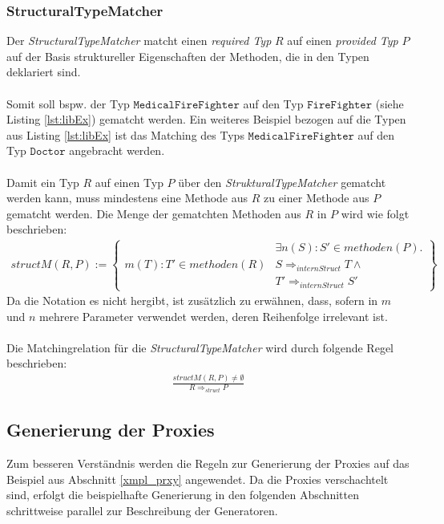 \documentclass[a4paper,12pt]{article}
\begin{document}
\subsubsection{StructuralTypeMatcher} 
Der \emph{StructuralTypeMatcher} matcht einen \emph{required Typ} $R$ auf einen \emph{provided Typ} $P$ auf der Basis struktureller Eigenschaften der Methoden, die in den Typen deklariert sind. 
\\\\
Somit soll bspw. der Typ $\texttt{MedicalFireFighter}$ auf den Typ $\texttt{FireFighter}$ (siehe Listing \ref{lst:libEx}) gematcht werden. Ein weiteres Beispiel bezogen auf die Typen aus Listing \ref{lst:libEx} ist das Matching des Typs $\texttt{MedicalFireFighter}$ auf den Typ $\texttt{Doctor}$ angebracht werden.
\\\\
Damit ein Typ $R$ auf einen Typ $P$ über den \emph{StrukturalTypeMatcher} gematcht werden kann, muss mindestens eine Methode aus $R$ zu einer Methode aus $P$ gematcht werden. Die Menge der gematchten Methoden aus $R$ in $P$ wird wie folgt beschrieben:
\begin{gather*}
structM(R,P) := \left\{ 
				\begin{array}{l|l}
						& \exists n(S):S' \in methoden(P) .\\													m(T):T' \in methoden(R) &  S\Rightarrow_{internStruct}T \wedge \\
										& T' \Rightarrow_{internStruct}S'
				\end{array}
              \right\}
\end{gather*}
Da die Notation es nicht hergibt, ist zusätzlich zu erwähnen, dass, sofern in $m$ und $n$ mehrere Parameter verwendet werden, deren Reihenfolge irrelevant ist.\\\\
Die Matchingrelation für die \emph{StructuralTypeMatcher} wird durch folgende Regel beschrieben:
\begin{gather*}
\frac{structM(R,P) \neq \emptyset}{R \Rightarrow_{struct}P}
\end{gather*}
\subsection{Generierung der Proxies}
Zum besseren Verständnis werden die Regeln zur Generierung der Proxies auf das Beispiel aus Abschnitt \ref{xmpl_prxy} angewendet. Da die Proxies verschachtelt sind, erfolgt die beispielhafte Generierung in den folgenden Abschnitten schrittweise parallel zur Beschreibung der Generatoren.
\end{document}
